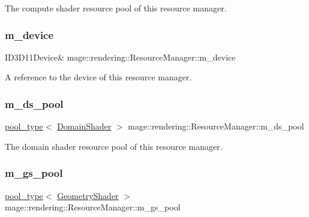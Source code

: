 The compute shader resource pool of this resource manager. \mbox{\label{classmage_1_1rendering_1_1_resource_manager_ad5233c9a748dcd828e5176ad5e8282c9}} 
\subsubsection{\texorpdfstring{m\+\_\+device}{m\_device}}
{\footnotesize\ttfamily I\+D3\+D11\+Device\& mage\+::rendering\+::\+Resource\+Manager\+::m\+\_\+device\hspace{0.3cm}{\ttfamily [private]}}

A reference to the device of this resource manager. \mbox{\label{classmage_1_1rendering_1_1_resource_manager_a49ccc18bfbca9728857d820266c3acf6}} 
\subsubsection{\texorpdfstring{m\+\_\+ds\+\_\+pool}{m\_ds\_pool}}
{\footnotesize\ttfamily \mbox{\hyperlink{classmage_1_1rendering_1_1_resource_manager_ab21a4e280087032ee533f267bd9bf602}{pool\+\_\+type}}$<$ \mbox{\hyperlink{namespacemage_1_1rendering_a02bd57ea68f48dd6e0d37a1362ad1ea2}{Domain\+Shader}} $>$ mage\+::rendering\+::\+Resource\+Manager\+::m\+\_\+ds\+\_\+pool\hspace{0.3cm}{\ttfamily [private]}}

The domain shader resource pool of this resource manager. \mbox{\label{classmage_1_1rendering_1_1_resource_manager_aa8fe17aa004cb46afc132a672bbb014d}} 
\subsubsection{\texorpdfstring{m\+\_\+gs\+\_\+pool}{m\_gs\_pool}}
{\footnotesize\ttfamily \mbox{\hyperlink{classmage_1_1rendering_1_1_resource_manager_ab21a4e280087032ee533f267bd9bf602}{pool\+\_\+type}}$<$ \mbox{\hyperlink{namespacemage_1_1rendering_accaa3591de8a0d7a2c72c1dcc0cf9592}{Geometry\+Shader}} $>$ mage\+::rendering\+::\+Resource\+Manager\+::m\+\_\+gs\+\_\+pool\hspace{0.3cm}{\ttfamily [private]}}

